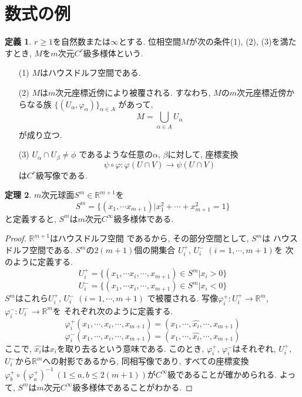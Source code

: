 \documentclass[twocolumn]{jarticle}
\theoremstyle{definition}
\newtheorem{theorem}{定理}[section]
\newtheorem{definition}[theorem]{定義}
\begin{document}
\section{数式の例}
\begin{definition}\label{def:C^r manifold}
  $r\geq 1$を自然数または$\infty$とする. 
  位相空間$M$が次の条件(1), (2), (3)を満たすとき, 
  $M$を$m$次元$C^r$級多様体という.
  \begin{itemize}
      \item[(1)]$M$はハウスドルフ空間である.
      \item[(2)]$M$は$m$次元座標近傍により被覆される. 
      すなわち, $M$の$m$次元座標近傍からなる族
      $\{(U_\alpha, \varphi_\alpha)\}_{\alpha \in A}$
      があって, 
      $$M = \bigcup_{\alpha \in A}U_\alpha$$
      が成り立つ. 
      \item[(3)]$U_\alpha \cap U_\beta \neq \phi$
      であるような任意の$\alpha$, $\beta$に対して, 座標変換
      $$\psi \circ \varphi:\varphi(U\cap V)\rightarrow \psi(U\cap V)$$
      は$C^r$級写像である. 
  \end{itemize}
\end{definition}
\begin{theorem}
  $m$次元球面$S^m \in \mathbb{R}^{m+1}$を
  $$S^m=\{(x_1,\cdots x_{m+1})|x_1^2+\cdots +x_{m+1}^2=1\}$$
  と定義すると, $S^m$は$m$次元$C^{\infty}$級多様体である. 
\end{theorem}
\begin{proof}
  $\mathbb{R}^{m+1}$はハウスドルフ空間
      であるから, その部分空間として, $S^m$は
      ハウスドルフ空間である. 
      $S^m$の$2(m+1)$個の開集合
      $U_i^+$, $U_i^-$ $(i=1,\cdots ,m+1)$を
      次のように定義する. 
      $$U_i^+ = \{(x_1, \cdots x_i, \cdots ,x_{m+1})\in S^m|x_i>0\}$$
      $$U_i^- = \{(x_1, \cdots x_i, \cdots ,x_{m+1})\in S^m|x_i<0\}$$
      $S^m$はこれら$U_i^+$, $U_i^-$ $(i=1,\cdots ,m+1)$
      で被覆される. 写像$\varphi_i^+:U_i^+ \rightarrow \mathbb{R}^m$, 
      $\varphi_i^-:U_i^- \rightarrow \mathbb{R}^m$を
      それぞれ次のように定義する. 
      $$\varphi_i^+(x_1,\cdots ,x_i,\cdots, x_{m+1})=(x_1,\cdots ,\hat{x_i},\cdots ,x_{m+1})$$
      $$\varphi_i^-(x_1,\cdots ,x_i,\cdots, x_{m+1})=(x_1,\cdots ,\hat{x_i},\cdots ,x_{m+1})$$
      ここで, $\hat{x_i}$は$x_i$を取り去るという意味である. このとき, 
      $\varphi_i^+$, $\varphi_i^-$はそれぞれ, $U_i^+$, 
      $U_i^-$から$\mathbb{R}^m$への射影であるから, 同相写像であり, 
      すべての座標変換$\varphi_b^+\circ(\varphi_a^+)^{-1}\ 
      (1\leq a, b\leq 2(m+1))$が$C^{\infty}$級であることが確かめられる. 
      よって, $S^m$は$m$次元$C^{\infty}$級多様体であることがわかる. 
\end{proof}
\end{document}
